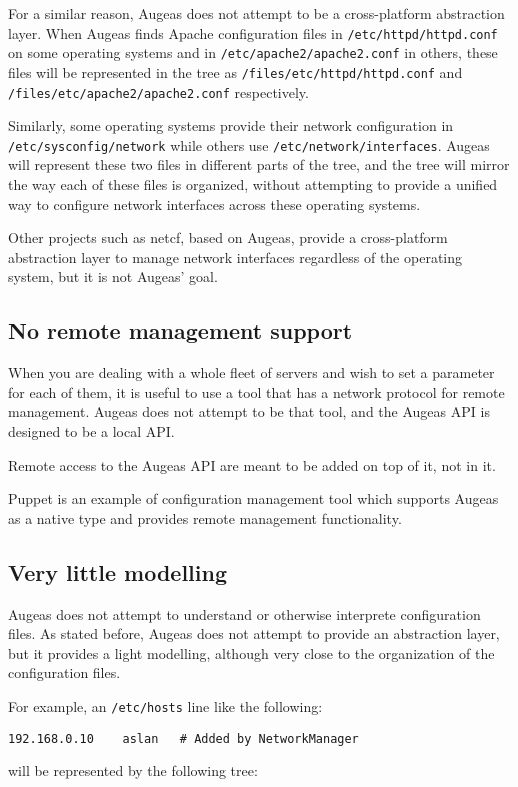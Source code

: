 For a similar reason, Augeas does not attempt to be a cross-platform abstraction layer. When Augeas finds Apache configuration files in \verb!/etc/httpd/httpd.conf! on some operating systems and in \verb!/etc/apache2/apache2.conf! in others, these files will be represented in the tree as \verb!/files/etc/httpd/httpd.conf! and \verb!/files/etc/apache2/apache2.conf! respectively.

Similarly, some operating systems provide their network configuration in \verb!/etc/sysconfig/network! while others use \verb!/etc/network/interfaces!. Augeas will represent these two files in different parts of the tree, and the tree will mirror the way each of these files is organized, without attempting to provide a unified way to configure network interfaces across these operating systems.

Other projects such as netcf, based on Augeas, provide a cross-platform abstraction layer to manage network interfaces regardless of the operating system, but it is not Augeas' goal.

\subsection{No remote management support}

When you are dealing with a whole fleet of servers and wish to set a parameter for each of them, it is useful to use a tool that has a network protocol for remote management. Augeas does not attempt to be that tool, and the Augeas API is designed to be a local API.

Remote access to the Augeas API are meant to be added on top of it, not in it.

Puppet is an example of configuration management tool which supports Augeas as a native type and provides remote management functionality.

\subsection{Very little modelling}

Augeas does not attempt to understand or otherwise interprete configuration files. As stated before, Augeas does not attempt to provide an abstraction layer, but it provides a light modelling, although very close to the organization of the configuration files.

For example, an \verb!/etc/hosts! line like the following:

\begin{verbatim}
192.168.0.10    aslan   # Added by NetworkManager
\end{verbatim}
will be represented by the following tree:

